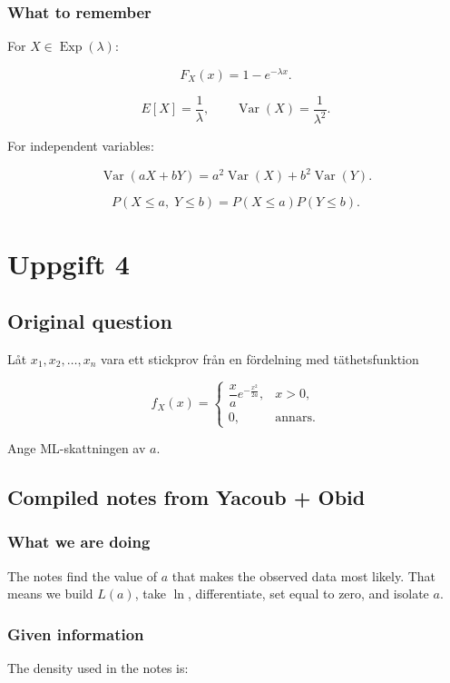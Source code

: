 \documentclass[10pt]{article}
\begin{document}
\subsubsection*{What to remember}
For \(X\in \operatorname{Exp}(\lambda)\):

\[
F_X(x)=1-e^{-\lambda x}.
\]

\[
E[X]=\frac{1}{\lambda},
\qquad
\operatorname{Var}(X)=\frac{1}{\lambda^2}.
\]

For independent variables:

\[
\operatorname{Var}(aX+bY)
=a^2\operatorname{Var}(X)
 +b^2\operatorname{Var}(Y).
\]

\[
P(X\leq a,\;Y\leq b)
=P(X\leq a)P(Y\leq b).
\]

\section*{Uppgift 4}

\subsection*{Original question}
Låt \(x_1,x_2,\ldots,x_n\) vara ett stickprov
från en fördelning med täthetsfunktion

\[
f_X(x)=
\begin{cases}
\dfrac{x}{a}e^{-\frac{x^2}{2a}},
& x>0,\\[2mm]
0, & \text{annars.}
\end{cases}
\]

Ange ML-skattningen av \(a\).

\subsection*{Compiled notes from Yacoub + Obid}

\subsubsection*{What we are doing}
The notes find the value of \(a\) that makes the
observed data most likely.
That means we build \(L(a)\), take \(\ln\),
differentiate, set equal to zero,
and isolate \(a\).

\subsubsection*{Given information}
The density used in the notes is:
\end{document}
